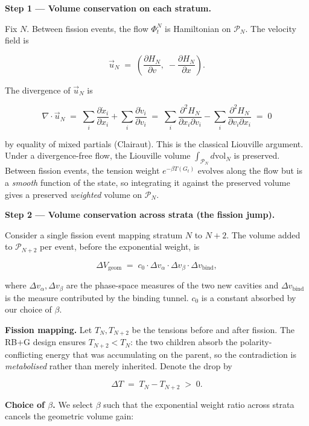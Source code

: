 \documentclass[
  11pt,
  a4paper,
]{article}
\begin{document}
\textbf{Step 1 --- Volume conservation on each stratum.}

Fix \(N\). Between fission events, the flow \(\Phi_t^N\) is Hamiltonian
on \(\mathcal{P}_N\). The velocity field is

\[
\vec{u}_N \;=\; \left( \frac{\partial H_N}{\partial v}, \; -\frac{\partial H_N}{\partial x} \right).
\]

The divergence of \(\vec{u}_N\) is

\[
\nabla \cdot \vec{u}_N \;=\;
\sum_i \frac{\partial \dot{x}_i}{\partial x_i} + \sum_i \frac{\partial \dot{v}_i}{\partial v_i}
\;=\; \sum_i \frac{\partial^2 H_N}{\partial x_i \partial v_i} - \sum_i \frac{\partial^2 H_N}{\partial v_i \partial x_i}
\;=\; 0
\]

by equality of mixed partials (Clairaut). This is the classical
Liouville argument. Under a divergence-free flow, the Liouville volume
\(\int_{\mathcal{P}_N} d\text{vol}_N\) is preserved. Between fission
events, the tension weight \(e^{-\beta T(G_t)}\) evolves along the flow
but is a \emph{smooth} function of the state, so integrating it against
the preserved volume gives a preserved \emph{weighted} volume on
\(\mathcal{P}_N\).

\textbf{Step 2 --- Volume conservation across strata (the fission
jump).}

Consider a single fission event mapping stratum \(N\) to \(N+2\). The
volume added to \(\mathcal{P}_{N+2}\) per event, before the exponential
weight, is

\[
\Delta V_\text{geom} \;=\; c_0 \cdot \Delta v_\alpha \cdot \Delta v_\beta \cdot \Delta v_\text{bind},
\]

where \(\Delta v_\alpha, \Delta v_\beta\) are the phase-space measures
of the two new cavities and \(\Delta v_\text{bind}\) is the measure
contributed by the binding tunnel. \(c_0\) is a constant absorbed by our
choice of \(\beta\).

\textbf{Fission mapping.} Let \(T_N, T_{N+2}\) be the tensions before
and after fission. The RB+G design ensures \(T_{N+2} < T_N\): the two
children absorb the polarity-conflicting energy that was accumulating on
the parent, so the contradiction is \emph{metabolised} rather than
merely inherited. Denote the drop by

\[
\Delta T \;=\; T_N - T_{N+2} \;>\; 0.
\]

\textbf{Choice of \(\beta\).} We select \(\beta\) such that the
exponential weight ratio across strata cancels the geometric volume
gain:
\end{document}
